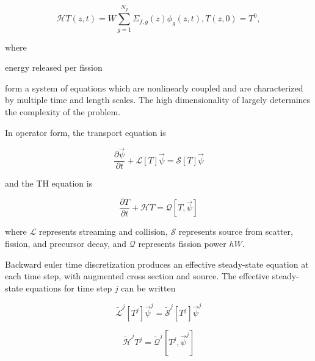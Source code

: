 \documentclass{proposal}
\newcommand{\calL}{\mathcal{L}}
\newcommand{\calS}{\mathcal{S}}
\newcommand{\calH}{\mathcal{H}}
\newcommand{\calQ}{\mathcal{Q}}
\begin{document}
\begin{subequations}\label{eq:th-general}
    \begin{equation}
        \calH T(z, t) = W\sum_{g=1}^{N_g}\Sigma_{f, g}(z)\phi_g(z, t),
    \end{equation}
    \begin{equation}
        T(z, 0) = T^0,
    \end{equation}
\end{subequations}

where
\begin{description}[labelindent=1cm, labelwidth=1.2cm, before={\renewcommand\makelabel[1]{##1 $=$}}]
    \item[$W$] energy released per fission
\end{description}



 form a system of equations which are nonlinearly coupled and are characterized by multiple time and length scales. The high dimensionality of  largely determines the complexity of the problem.

In operator form, the transport equation is

\begin{equation}
    \frac{\partial\vec{\psi}}{\partial t} + \calL[T]\vec{\psi} = \calS[T]\vec{\psi}
\end{equation}

and the TH equation is

\begin{equation}
    \frac{\partial T}{\partial t} + \calH T = \calQ[T, \vec{\psi}]
\end{equation}

where $\calL$ represents streaming and collision, $\calS$ represents source from scatter, fission, and precursor decay, and $\calQ$ represents fission power $hW$.

Backward euler time discretization produces an effective steady-state equation at each time step, with augmented cross section and source. The effective steady-state equations for time step $j$ can be written

\begin{equation}
    \tilde{\calL}^j[T^j]\vec{\psi}^j = \tilde{\calS}^j[T^j]\vec{\psi}^j
\end{equation}

\begin{equation}
     \tilde{\calH}^j T^j = \tilde{\calQ}^j[T^j, \vec{\psi}^j]
\end{equation}
\end{document}
